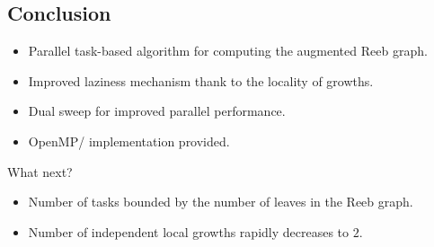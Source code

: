 \subsection*{Conclusion}
\begin{frame*}
\begin{itemize}
\item Parallel task-based algorithm for computing the augmented Reeb graph.
\item Improved laziness mechanism thank to the locality of growths.
\item Dual sweep for improved parallel performance.
\item OpenMP/\cpluspluslogo{} implementation provided.
\end{itemize}
\begin{block}{What next?}
\begin{itemize}
\item Number of tasks bounded by the number of leaves in the Reeb graph.
\item Number of independent local growths rapidly decreases to $2$.
\end{itemize}
\end{block}
\end{frame*}